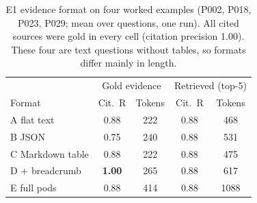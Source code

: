 \begin{table}[t]
\centering\footnotesize
\caption{E4 visual input on four table/figure questions (P013, P028, P039, P040; gold evidence). Acc.: manual answer accuracy (partial 0.5); ALR: attribute leakage rate over claims; Cit.\ R: gold regions cited; tokens are means over questions. Full-page images and crops are given to the VLM generator without text; OCR + caption pods is our text representation. KV: GPU KV-cache memory held by the prompt, computed as prompt tokens $\times$ 56\,KiB (Qwen2.5-VL-7B: 28 layers, 4 KV heads, head size 128, FP16); vision-encoder activations are not included. Offline extraction cost is shared by all inputs (median 19\,s per page for the whole offline extraction pipeline).}
\label{tab:e4}
\setlength{\tabcolsep}{3pt}
\end{table}

\begin{table}[t]
\centering\footnotesize
\caption{E1 evidence format on four worked examples (P002, P018, P023, P029; mean over questions, one run). All cited sources were gold in every cell (citation precision 1.00). These four are text questions without tables, so formats differ mainly in length.}
\label{tab:e1}
\setlength{\tabcolsep}{3pt}
\begin{tabular}{@{}lcccc@{}}
\toprule
 & \multicolumn{2}{c}{Gold evidence} & \multicolumn{2}{c}{Retrieved (top-5)} \\
Format & Cit.\ R & Tokens & Cit.\ R & Tokens \\
\midrule
A flat text & 0.88 & 222 & 0.88 & 468 \\
B JSON & 0.75 & 240 & 0.88 & 531 \\
C Markdown table & 0.88 & 222 & 0.88 & 475 \\
D + breadcrumb & \textbf{1.00} & 265 & 0.88 & 617 \\
E full pods & 0.88 & 414 & 0.88 & 1088 \\
\bottomrule
\end{tabular}
\end{table}
